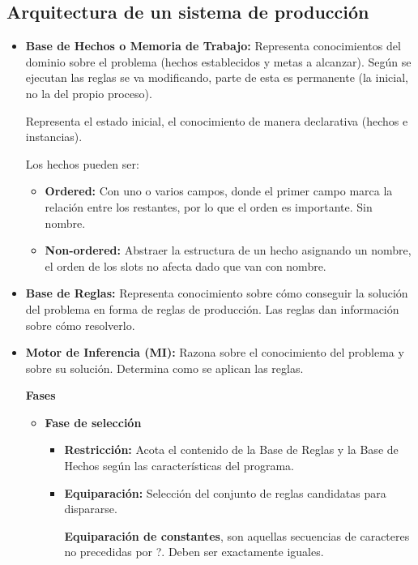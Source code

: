 \documentclass[12pt, twoside, openright]{report} %
\begin{document}
\subsection{Arquitectura de un sistema de producción}
\begin{itemize}
	\item \textbf{Base de Hechos o Memoria de Trabajo:} Representa conocimientos del dominio sobre el problema (hechos establecidos y metas a alcanzar). Según se ejecutan las reglas se va modificando, parte de esta es permanente (la inicial, no la del propio proceso).
	      
	      Representa el estado inicial, el conocimiento de manera declarativa (hechos e instancias).
	      
	      Los hechos pueden ser:
	      \begin{itemize}
		      \item \textbf{Ordered:} Con uno o varios campos, donde el primer campo marca la relación entre los restantes, por lo que el orden es importante. Sin nombre.
		      \item \textbf{Non-ordered:} Abstraer la estructura de un hecho asignando un nombre, el orden de los slots no afecta dado que van con nombre.
	      \end{itemize}
	\item \textbf{Base de Reglas:} Representa conocimiento sobre cómo conseguir la solución del problema en forma de reglas de producción. Las reglas dan información sobre cómo resolverlo.
	\item \textbf{Motor de Inferencia (MI):} Razona sobre el conocimiento del problema y sobre su solución. Determina como se aplican las reglas.
	      
	      \pagebreak
	      \textbf{Fases}
	      \begin{itemize}
		      \item \textbf{Fase de selección}
		            \begin{itemize}
			            \item \textbf{Restricción:} Acota el contenido de la Base de Reglas y la Base de Hechos según las características del programa.
			            \item \textbf{Equiparación:} Selección del conjunto de reglas candidatas para dispararse.
			                  
			                  \textbf{Equiparación de constantes}, son aquellas secuencias de caracteres no precedidas por ?. Deben ser exactamente iguales.
			                  

\end{itemize}
\end{itemize}
\end{itemize}
\end{document}
